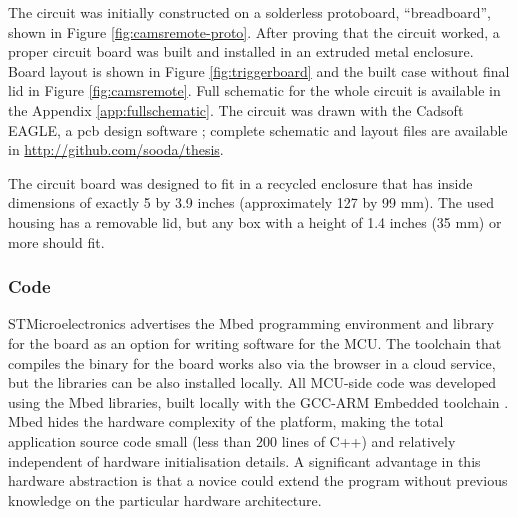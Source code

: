 The circuit was initially constructed on a solderless protoboard, ``breadboard'', shown in Figure \ref{fig:camsremote-proto}.
After proving that the circuit worked, a proper circuit board was built and installed in an extruded metal enclosure.
Board layout is shown in Figure \ref{fig:triggerboard} and the built case without final lid in Figure \ref{fig:camsremote}.
Full schematic for the whole circuit is available in the Appendix \ref{app:fullschematic}.
The circuit was drawn with the Cadsoft EAGLE, a pcb design software \cite{eaglepcb}; complete schematic and layout files are available in \url {http://github.com/sooda/thesis}.

The circuit board was designed to fit in a recycled enclosure that has inside dimensions of exactly 5 by 3.9 inches (approximately 127 by 99 mm).
The used housing has a removable lid, but any box with a height of 1.4 inches (35 mm) or more should fit.





\subsubsection{Code}

STMicroelectronics advertises the Mbed programming environment and library for the board as an option for writing software for the MCU. \cite{mbednucleo}
The toolchain that compiles the binary for the board works also via the browser in a cloud service, but the libraries can be also installed locally.
All MCU-side code was developed using the Mbed libraries, built locally with the GCC-ARM Embedded toolchain \cite{launchpad-gcc-arm}.
Mbed hides the hardware complexity of the platform, making the total application source code small (less than 200 lines of C++) and relatively independent of hardware initialisation details.
A significant advantage in this hardware abstraction is that a novice could extend the program without previous knowledge on the particular hardware architecture.

